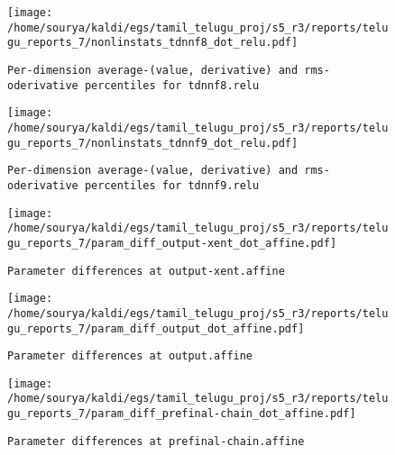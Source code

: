 \documentclass[prl,10pt,twocolumn]{revtex4}
\begin{document}
\newpage
\begin{figure}[h]
  \begin{center}
    \caption{\texttt{Per-dimension average-(value, derivative) and rms-oderivative percentiles for tdnnf8.relu}}
    \texttt{[image: /home/sourya/kaldi/egs/tamil\_telugu\_proj/s5\_r3/reports/telugu\_reports\_7/nonlinstats\_tdnnf8\_dot\_relu.pdf]}
  \end{center}
\end{figure}
\clearpage


\newpage
\begin{figure}[h]
  \begin{center}
    \caption{\texttt{Per-dimension average-(value, derivative) and rms-oderivative percentiles for tdnnf9.relu}}
    \texttt{[image: /home/sourya/kaldi/egs/tamil\_telugu\_proj/s5\_r3/reports/telugu\_reports\_7/nonlinstats\_tdnnf9\_dot\_relu.pdf]}
  \end{center}
\end{figure}
\clearpage


\newpage
\begin{figure}[h]
  \begin{center}
    \caption{\texttt{Parameter differences at output-xent.affine}}
    \texttt{[image: /home/sourya/kaldi/egs/tamil\_telugu\_proj/s5\_r3/reports/telugu\_reports\_7/param\_diff\_output-xent\_dot\_affine.pdf]}
  \end{center}
\end{figure}
\clearpage


\newpage
\begin{figure}[h]
  \begin{center}
    \caption{\texttt{Parameter differences at output.affine}}
    \texttt{[image: /home/sourya/kaldi/egs/tamil\_telugu\_proj/s5\_r3/reports/telugu\_reports\_7/param\_diff\_output\_dot\_affine.pdf]}
  \end{center}
\end{figure}
\clearpage


\newpage
\begin{figure}[h]
  \begin{center}
    \caption{\texttt{Parameter differences at prefinal-chain.affine}}
    \texttt{[image: /home/sourya/kaldi/egs/tamil\_telugu\_proj/s5\_r3/reports/telugu\_reports\_7/param\_diff\_prefinal-chain\_dot\_affine.pdf]}
  \end{center}
\end{figure}
\clearpage
\end{document}
